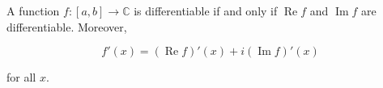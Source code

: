 A function $f: [a, b] \to \mathbb{C}$ is differentiable if and only if $\operatorname{Re} f$ and $\operatorname{Im} f$ are differentiable. Moreover,

$$f'(x) = (\operatorname{Re} f)'(x) + i(\operatorname{Im} f)'(x)$$

for all $x$.
